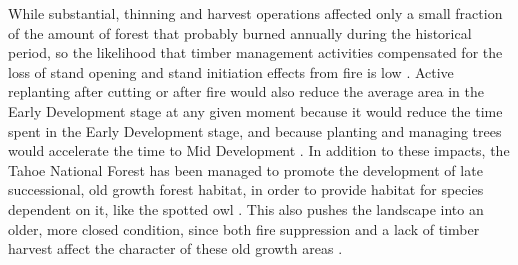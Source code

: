 While substantial, thinning and harvest operations affected only a small fraction of the amount of forest that probably burned annually during the historical period, so the likelihood that timber management activities compensated for the loss of stand opening and stand initiation effects from fire is low \citep{Cushman2011,USDAForestService2012}. Active replanting after cutting or after fire would also reduce the average area in the Early Development stage at any given moment because it would reduce the time spent in the Early Development stage, and because planting and managing trees would accelerate the time to Mid Development \citep{Dellasala2014}. In addition to these impacts, the Tahoe National Forest has been managed to promote the development of late successional, old growth forest habitat, in order to provide habitat for species dependent on it, like the spotted owl \citep{USDAForestService2004a}. This also pushes the landscape into an older, more closed condition, since both fire suppression and a lack of timber harvest affect the character of these old growth areas \citep{Franklin1996}.




